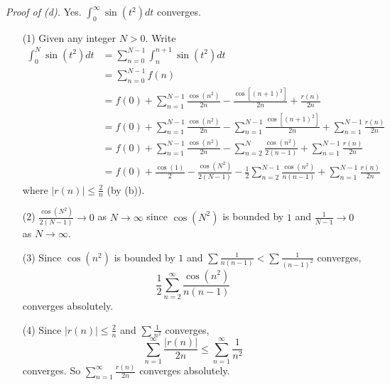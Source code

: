 \documentclass{article}
\begin{document}
\emph{Proof of (d).}
Yes. $\int_{0}^{\infty} \sin(t^2) dt$ converges.
\begin{enumerate}
  \item[(1)]
  Given any integer $N > 0$.
  Write
  \begin{align*}
    \int_{0}^{N} \sin(t^2) dt
    &= \sum_{n=0}^{N-1} \int_{n}^{n+1} \sin(t^2) dt \\
    &= \sum_{n=0}^{N-1} f(n) \\
    &= f(0)
      + \sum_{n=1}^{N-1}
      \frac{\cos(n^2)}{2n} - \frac{\cos[(n+1)^2]}{2n} + \frac{r(n)}{2n} \\
    &= f(0)
      + \sum_{n=1}^{N-1} \frac{\cos(n^2)}{2n}
      - \sum_{n=1}^{N-1} \frac{\cos[(n+1)^2]}{2n}
      + \sum_{n=1}^{N-1} \frac{r(n)}{2n} \\
    &= f(0)
      + \sum_{n=1}^{N-1} \frac{\cos(n^2)}{2n}
      - \sum_{n=2}^{N} \frac{\cos(n^2)}{2(n-1)}
      + \sum_{n=1}^{N-1} \frac{r(n)}{2n} \\
    &= f(0) + \frac{\cos(1)}{2} - \frac{\cos(N^2)}{2(N-1)}
      - \frac{1}{2} \sum_{n=2}^{N-1} \frac{\cos(n^2)}{n(n-1)}
      + \sum_{n=1}^{N-1} \frac{r(n)}{2n}
  \end{align*}
  where $|r(n)| \leq \frac{2}{n}$ (by (b)).

  \item[(2)]
  $\frac{\cos(N^2)}{2(N-1)} \to 0$ as $N \to \infty$
  since $\cos(N^2)$ is bounded by $1$ and $\frac{1}{N-1} \to 0$ as $N \to \infty$.

  \item[(3)]
  Since $\cos(n^2)$ is bounded by $1$ and
  $\sum \frac{1}{n(n-1)} < \sum \frac{1}{(n-1)^2}$ converges,
  \[
    \frac{1}{2} \sum_{n=2}^{\infty} \frac{\cos(n^2)}{n(n-1)}
  \]
  converges absolutely.

  \item[(4)]
  Since $|r(n)| \leq \frac{2}{n}$ and
  $\sum \frac{1}{n^2}$ converges,
  \[
    \sum_{n=1}^{\infty} \frac{|r(n)|}{2n}
    \leq \sum_{n=1}^{\infty} \frac{1}{n^2}
  \]
  converges.
  So $\sum_{n=1}^{\infty} \frac{r(n)}{2n}$ converges absolutely.


\end{enumerate}
\end{document}
